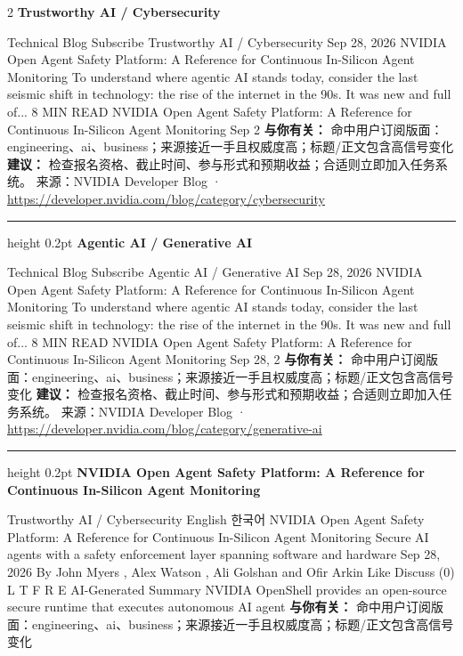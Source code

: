 \documentclass[10.5pt]{ctexart}
\begin{document}
\begin{multicols}{2}
{\large\bfseries Trustworthy AI / Cybersecurity}\par
Technical Blog Subscribe Trustworthy AI / Cybersecurity Sep 28, 2026 NVIDIA Open Agent Safety Platform: A Reference for Continuous In-Silicon Agent Monitoring To understand where agentic AI stands today, consider the last seismic shift in technology: the rise of the internet in the 90s. It was new and full of... 8 MIN READ NVIDIA Open Agent Safety Platform: A Reference for Continuous In-Silicon Agent Monitoring Sep 2
\textbf{与你有关：} 命中用户订阅版面：engineering、ai、business；来源接近一手且权威度高；标题/正文包含高信号变化
\textbf{建议：} 检查报名资格、截止时间、参与形式和预期收益；合适则立即加入任务系统。
{\footnotesize\color{ormuted} 来源：NVIDIA Developer Blog · \url{https://developer.nvidia.com/blog/category/cybersecurity}}
\vspace{2mm}
\hrule height 0.2pt
\vspace{2mm}
{\large\bfseries Agentic AI / Generative AI}\par
Technical Blog Subscribe Agentic AI / Generative AI Sep 28, 2026 NVIDIA Open Agent Safety Platform: A Reference for Continuous In-Silicon Agent Monitoring To understand where agentic AI stands today, consider the last seismic shift in technology: the rise of the internet in the 90s. It was new and full of... 8 MIN READ NVIDIA Open Agent Safety Platform: A Reference for Continuous In-Silicon Agent Monitoring Sep 28, 2
\textbf{与你有关：} 命中用户订阅版面：engineering、ai、business；来源接近一手且权威度高；标题/正文包含高信号变化
\textbf{建议：} 检查报名资格、截止时间、参与形式和预期收益；合适则立即加入任务系统。
{\footnotesize\color{ormuted} 来源：NVIDIA Developer Blog · \url{https://developer.nvidia.com/blog/category/generative-ai}}
\vspace{2mm}
\hrule height 0.2pt
\vspace{2mm}
{\large\bfseries NVIDIA Open Agent Safety Platform: A Reference for Continuous In-Silicon Agent Monitoring}\par
Trustworthy AI / Cybersecurity English 한국어 NVIDIA Open Agent Safety Platform: A Reference for Continuous In-Silicon Agent Monitoring Secure AI agents with a safety enforcement layer spanning software and hardware Sep 28, 2026 By John Myers , Alex Watson , Ali Golshan and Ofir Arkin Like Discuss (0) L T F R E AI-Generated Summary NVIDIA OpenShell provides an open-source secure runtime that executes autonomous AI agent
\textbf{与你有关：} 命中用户订阅版面：engineering、ai、business；来源接近一手且权威度高；标题/正文包含高信号变化

\end{multicols}
\end{document}
